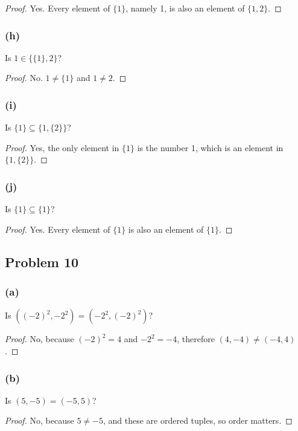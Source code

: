 \documentclass[14pt]{extarticle}
\begin{document}
\begin{proof}
Yes. Every element of $\{1\}$, namely 1, is also an element of $\{1, 2\}$.
\end{proof}

\subsubsection{(h)}
Is $1 \in \{\{1\}, 2\}$?

\begin{proof}
No. $1 \neq \{1\}$ and $1 \neq 2$.
\end{proof}

\subsubsection{(i)}
Is $\{1\} \subseteq  \{1, \{2\}\}$?

\begin{proof}
Yes, the only element in $\{1\}$ is the number 1, which is an element in
$\{1, \{2\}\}$.
\end{proof}

\subsubsection{(j)}
Is $\{1\} \subseteq \{1\}$?

\begin{proof}
Yes. Every element of $\{1\}$ is also an element of $\{1\}$.
\end{proof}

\subsection{Problem 10}
\subsubsection{(a)}
Is $((-2)^2, -2^2) = (-2^2, (-2)^2)$?

\begin{proof}
No, because $(-2)^2 = 4$ and $-2^2 = -4$, therefore $(4, -4) \neq (-4, 4)$.
\end{proof}

\subsubsection{(b)}
Is $(5, -5) = (-5, 5)$?

\begin{proof}
No, because $5 \neq -5$, and these are ordered tuples, so order matters.
\end{proof}
\end{document}
